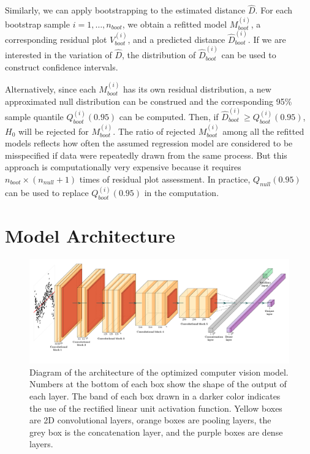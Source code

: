 \documentclass[]{interact}
\theoremstyle{plain}%
\theoremstyle{definition}
\theoremstyle{remark}
\begin{document}
Similarly, we can apply bootstrapping to the estimated distance
\(\hat{D}\). For each bootstrap sample \(i = 1, \dots, n_{boot}\), we
obtain a refitted model \(M^{(i)}_{boot}\), a corresponding residual
plot \(V^{(i)}_{boot}\), and a predicted distance
\(\hat{D}^{(i)}_{boot}\). If we are interested in the variation of
\(\hat{D}\), the distribution of \(\hat{D}^{(i)}_{boot}\) can be used to
construct confidence intervals.

Alternatively, since each \(M_{boot}^{(i)}\) has its own residual
distribution, a new approximated null distribution can be construed and
the corresponding 95\% sample quantile \(Q_{boot}^{(i)}(0.95)\) can be
computed. Then, if \(\hat{D}_{boot}^{(i)} \geq Q_{boot}^{(i)}(0.95)\),
\(H_0\) will be rejected for \(M_{boot}^{(i)}\). The ratio of rejected
\(M_{boot}^{(i)}\) among all the refitted models reflects how often the
assumed regression model are considered to be misspecified if data were
repeatedly drawn from the same process. But this approach is
computationally very expensive because it requires
\(n_{boot} \times (n_{null} + 1)\) times of residual plot assessment. In
practice, \(Q_{null}(0.95)\) can be used to replace
\(Q_{boot}^{(i)}(0.95)\) in the computation.

\section{Model Architecture}\label{sec-model-architecture}

\begin{figure}[!h]

{\centering \includegraphics[width=1\linewidth]{paper_files/figure-latex/cnn-diag-1} 

}

\caption{Diagram of the architecture of the optimized computer vision model. Numbers at the bottom of each box show the shape of the output of each layer. The band of each box drawn in a darker color indicates the use of the rectified linear unit activation function.  Yellow boxes are 2D convolutional layers, orange boxes are pooling layers, the grey box is the concatenation layer, and the purple boxes are dense layers.}\label{fig:cnn-diag}
\end{figure}
\end{document}
